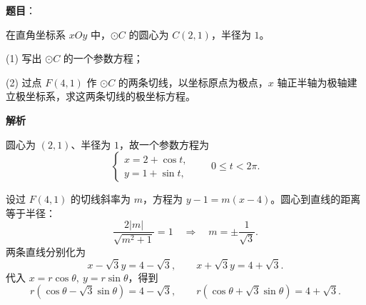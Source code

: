 \begin{answer}

\textbf{题目}：

在直角坐标系 $xOy$ 中，$\odot C$ 的圆心为 $C(2,1)$，半径为 $1$。

(1) 写出 $\odot C$ 的一个参数方程；

(2) 过点 $F(4,1)$ 作 $\odot C$ 的两条切线，以坐标原点为极点，$x$ 轴正半轴为极轴建立极坐标系，求这两条切线的极坐标方程。

\textbf{解析}


圆心为 $(2,1)$、半径为 $1$，故一个参数方程为
\nopagebreak[4]
\[
\begin{cases}
x=2+\cos t,\\
y=1+\sin t,
\end{cases}\qquad 0\leqslant t<2\pi.
\]


设过 $F(4,1)$ 的切线斜率为 $m$，方程为 $y-1=m(x-4)$。圆心到直线的距离等于半径：
\nopagebreak[4]
\[
\frac{2|m|}{\sqrt{m^2+1}}=1
\quad\Longrightarrow\quad m=\pm\frac1{\sqrt3}.
\]
两条直线分别化为
\nopagebreak[4]
\[
x-\sqrt3y=4-\sqrt3,\qquad x+\sqrt3y=4+\sqrt3.
\]
代入 $x=r\cos\theta,\ y=r\sin\theta$，得到
\nopagebreak[4]
\[
r(\cos\theta-\sqrt3\sin\theta)=4-\sqrt3,\qquad
r(\cos\theta+\sqrt3\sin\theta)=4+\sqrt3.
\]



\end{answer}
